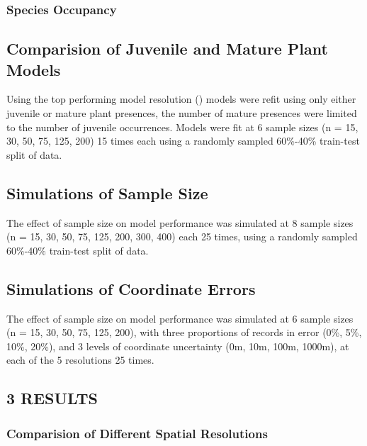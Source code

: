 \documentclass[
]{article}
\begin{document}
\hypertarget{species-occupancy}{%
\subsubsection{Species Occupancy}\label{species-occupancy}}

\hypertarget{comparision-of-juvenile-and-mature-plant-models}{%
\subsection{Comparision of Juvenile and Mature Plant
Models}\label{comparision-of-juvenile-and-mature-plant-models}}

Using the top performing model resolution () models were refit using
only either juvenile or mature plant presences, the number of mature
presences were limited to the number of juvenile occurrences. Models
were fit at 6 sample sizes (n = 15, 30, 50, 75, 125, 200) 15 times each
using a randomly sampled 60\%-40\% train-test split of data.

\hypertarget{simulations-of-sample-size}{%
\subsection{Simulations of Sample
Size}\label{simulations-of-sample-size}}

The effect of sample size on model performance was simulated at 8 sample
sizes (n = 15, 30, 50, 75, 125, 200, 300, 400) each 25 times, using a
randomly sampled 60\%-40\% train-test split of data.

\hypertarget{simulations-of-coordinate-errors}{%
\subsection{Simulations of Coordinate
Errors}\label{simulations-of-coordinate-errors}}

The effect of sample size on model performance was simulated at 6 sample
sizes (n = 15, 30, 50, 75, 125, 200), with three proportions of records
in error (0\%, 5\%, 10\%, 20\%), and 3 levels of coordinate uncertainty
(0m, 10m, 100m, 1000m), at each of the 5 resolutions 25 times.

\hypertarget{results}{%
\subsection{3 \textbar{} RESULTS}\label{results}}

\hypertarget{comparision-of-different-spatial-resolutions-1}{%
\subsubsection{Comparision of Different Spatial
Resolutions}\label{comparision-of-different-spatial-resolutions-1}}
\end{document}
